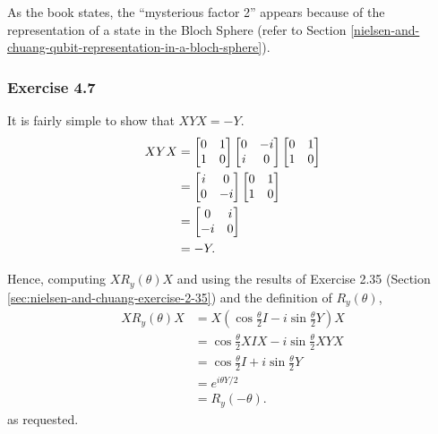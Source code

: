 As the book states,
the ``mysterious factor 2'' appears because of the
representation of a state in the Bloch Sphere
(refer to Section
\ref{nielsen-and-chuang-qubit-representation-in-a-bloch-sphere}).

\subsubsection{Exercise 4.7}
It is fairly simple to show that $XYX = -Y$.
\begin{align}
    XYX &= \left[\begin{matrix} 0 & 1 \\ 1 & 0 \end{matrix}\right] \left[\begin{matrix} 0 & -i \\ i & 0 \end{matrix}\right] \left[\begin{matrix} 0 & 1 \\ 1 & 0 \end{matrix}\right] \\
    &= \left[\begin{matrix} i & 0 \\ 0 & -i \end{matrix}\right] \left[\begin{matrix} 0 & 1 \\ 1 & 0 \end{matrix}\right] \\
    &= \left[\begin{matrix} 0 & i \\ -i & 0 \end{matrix}\right] \\
    &= -Y .
\end{align}

Hence, computing $X R_y(\theta) X$ and
using the results of Exercise 2.35 (Section \ref{sec:nielsen-and-chuang-exercise-2-35})
and the definition of $R_y(\theta)$,
\begin{align}
    X R_y(\theta) X &= X \left( \cos\frac{\theta}{2} I - i \sin\frac{\theta}{2} Y \right) X \\
    &= \cos\frac{\theta}{2} X I X - i \sin\frac{\theta}{2} X Y X \\
    &= \cos\frac{\theta}{2} I + i \sin\frac{\theta}{2} Y \\
    &= e^{i \theta Y / 2} \\
    &= R_y(-\theta) .
\end{align}
as requested.